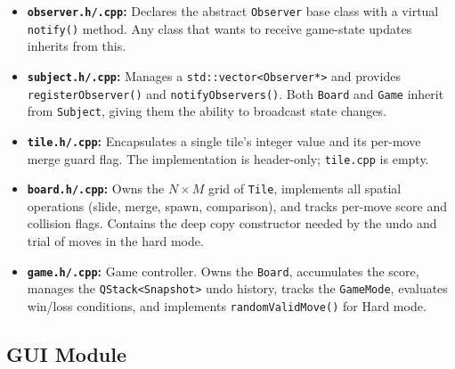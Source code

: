 \documentclass[a4paper,12pt]{article}
\begin{document}
\begin{itemize}
    \item \textbf{\texttt{observer.h/.cpp}:} Declares the abstract \texttt{Observer} base class with a virtual \texttt{notify()} method. Any class that wants to receive game-state updates inherits from this.

    \item \textbf{\texttt{subject.h/.cpp}:} Manages a \texttt{std::vector<Observer*>} and provides \texttt{registerObserver()} and \texttt{notifyObservers()}. Both \texttt{Board} and \texttt{Game} inherit from \texttt{Subject}, giving them the ability to broadcast state changes.

    \item \textbf{\texttt{tile.h/.cpp}:} Encapsulates a single tile's integer value and its per-move merge guard flag. The implementation is header-only; \texttt{tile.cpp} is empty.

    \item \textbf{\texttt{board.h/.cpp}:} Owns the $N\times M$ grid of \texttt{Tile}, implements all spatial operations (slide, merge, spawn, comparison), and tracks per-move score and collision flags. Contains the deep copy constructor needed by the undo and trial of moves in the hard mode.

    \item \textbf{\texttt{game.h/.cpp}:} Game controller. Owns the \texttt{Board}, accumulates the score, manages the \texttt{QStack<Snapshot>} undo history, tracks the \texttt{GameMode}, evaluates win/loss conditions, and implements \texttt{randomValidMove()} for Hard mode.
\end{itemize}

\newpage

\subsection{GUI Module}
\end{document}
